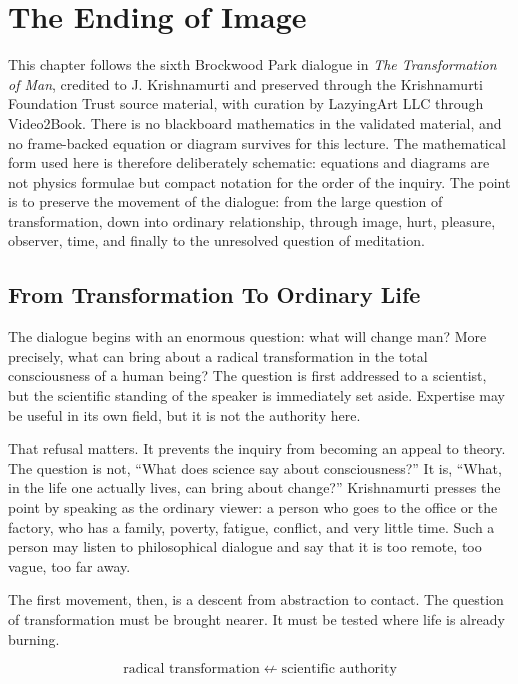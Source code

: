 \chapter{The Ending of Image}

This chapter follows the sixth Brockwood Park dialogue in \emph{The Transformation of Man}, credited to J. Krishnamurti and preserved through the Krishnamurti Foundation Trust source material, with curation by LazyingArt LLC through Video2Book. There is no blackboard mathematics in the validated material, and no frame-backed equation or diagram survives for this lecture. The mathematical form used here is therefore deliberately schematic: equations and diagrams are not physics formulae but compact notation for the order of the inquiry. The point is to preserve the movement of the dialogue: from the large question of transformation, down into ordinary relationship, through image, hurt, pleasure, observer, time, and finally to the unresolved question of meditation.

\section{From Transformation To Ordinary Life}

The dialogue begins with an enormous question: what will change man? More precisely, what can bring about a radical transformation in the total consciousness of a human being? The question is first addressed to a scientist, but the scientific standing of the speaker is immediately set aside. Expertise may be useful in its own field, but it is not the authority here.

That refusal matters. It prevents the inquiry from becoming an appeal to theory. The question is not, ``What does science say about consciousness?'' It is, ``What, in the life one actually lives, can bring about change?'' Krishnamurti presses the point by speaking as the ordinary viewer: a person who goes to the office or the factory, who has a family, poverty, fatigue, conflict, and very little time. Such a person may listen to philosophical dialogue and say that it is too remote, too vague, too far away.

The first movement, then, is a descent from abstraction to contact. The question of transformation must be brought nearer. It must be tested where life is already burning.

\begin{equation}
\text{radical transformation}
\;\not\leftarrow\;
\text{scientific authority}
\end{equation}

